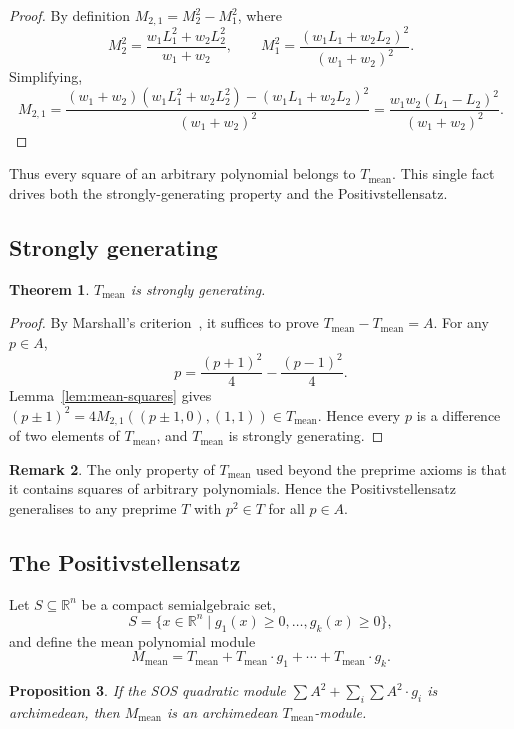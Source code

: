\documentclass{amsart}
\newtheorem{thm}{Theorem}[section]
\newtheorem{prop}[thm]{Proposition}
\theoremstyle{definition}
\newtheorem{rem}[thm]{Remark}
\numberwithin{equation}{section}
\newcommand{\reals}{\mathbb{R}}
\begin{document}
\begin{proof}
By definition $M_{2,1}=M_2^2-M_1^2$, where
\[
M_2^2=\frac{w_1L_1^2+w_2L_2^2}{w_1+w_2},\qquad
M_1^2=\frac{(w_1L_1+w_2L_2)^2}{(w_1+w_2)^2}.
\]
Simplifying,
\[
M_{2,1}=\frac{(w_1+w_2)(w_1L_1^2+w_2L_2^2)-(w_1L_1+w_2L_2)^2}{(w_1+w_2)^2}
=\frac{w_1w_2(L_1-L_2)^2}{(w_1+w_2)^2}.
\]
\end{proof}

Thus every square of an arbitrary polynomial belongs to $T_{\mathrm{mean}}$.
This single fact drives both the strongly-generating property and the
Positivstellensatz.

\subsection{Strongly generating}

\begin{thm}\label{thm:strongly-gen}
$T_{\mathrm{mean}}$ is strongly generating.
\end{thm}

\begin{proof}
By Marshall's criterion~\cite[Lemma~2.1]{Marshall02}, it suffices to prove
$T_{\mathrm{mean}}-T_{\mathrm{mean}}=A$.  For any $p\in A$,
\[
p=\frac{(p+1)^2}{4}-\frac{(p-1)^2}{4}.
\]
Lemma~\ref{lem:mean-squares} gives $(p\pm1)^2=4M_{2,1}((p\pm1,0),(1,1))
\in T_{\mathrm{mean}}$.  Hence every $p$ is a difference of two elements
of $T_{\mathrm{mean}}$, and $T_{\mathrm{mean}}$
is strongly generating.
\end{proof}

\begin{rem}\label{rem:minimal}
The only property of $T_{\mathrm{mean}}$ used beyond the preprime axioms is
that it contains squares of arbitrary polynomials.  Hence the
Positivstellensatz generalises to any preprime $T$ with $p^2\in T$ for all
$p\in A$.
\end{rem}

\subsection{The Positivstellensatz}

Let $S\subseteq\reals^n$ be a compact semialgebraic set,
\[
S=\{x\in\reals^n\mid g_1(x)\ge0,\dots,g_k(x)\ge0\},
\]
and define the mean polynomial module
\[
M_{\mathrm{mean}}=T_{\mathrm{mean}}+T_{\mathrm{mean}}\cdot g_1+\cdots
+T_{\mathrm{mean}}\cdot g_k.
\]

\begin{prop}\label{prop:archimedean}
If the SOS quadratic module $\sum A^2+\sum_i\sum A^2\cdot g_i$ is
archimedean, then $M_{\mathrm{mean}}$ is an archimedean $T_{\mathrm{mean}}$-module.
\end{prop}
\end{document}
